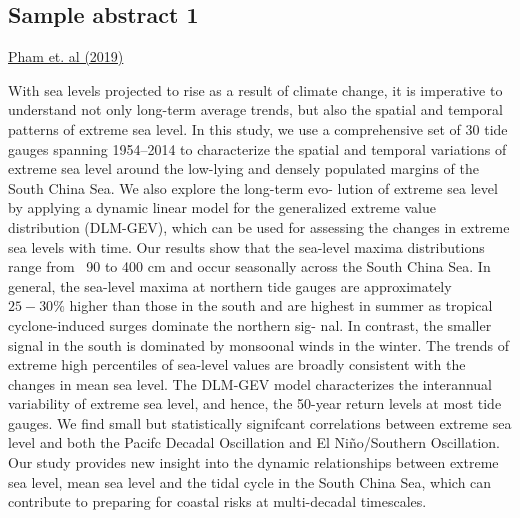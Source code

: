 \documentclass[12pt]{article}
\begin{document}
\subsection*{Sample abstract 1}
    \href{https://link.springer.com/article/10.1007/s11069-019-03596-2}{Pham et. al (2019)}
    \begin{paragraph}
        \noindent With sea levels projected to rise as a result of climate change, it is imperative to understand
not only long-term average trends, but also the spatial and temporal patterns of extreme sea
level. In this study, we use a comprehensive set of 30 tide gauges spanning 1954–2014 to
characterize the spatial and temporal variations of extreme sea level around the low-lying and densely populated margins of the South China Sea. We also explore the long-term evo-
lution of extreme sea level by applying a dynamic linear model for the generalized extreme value distribution (DLM-GEV), which can be used for assessing the changes in extreme
sea levels with time. Our results show that the sea-level maxima distributions range from
~90 to 400 cm and occur seasonally across the South China Sea. In general, the sea-level
maxima at northern tide gauges are approximately $25-30\%$ higher than those in the south and are highest in summer as tropical cyclone-induced surges dominate the northern sig-
nal. In contrast, the smaller signal in the south is dominated by monsoonal winds in the winter. The trends of extreme high percentiles of sea-level values are broadly consistent
with the changes in mean sea level. The DLM-GEV model characterizes the interannual variability of extreme sea level, and hence, the 50-year return levels at most tide gauges.
We find small but statistically signifcant correlations between extreme sea level and both
the Pacifc Decadal Oscillation and El Niño/Southern Oscillation. Our study provides new
insight into the dynamic relationships between extreme sea level, mean sea level and the
tidal cycle in the South China Sea, which can contribute to preparing for coastal risks at
multi-decadal timescales.
\end{paragraph}
\end{document}
